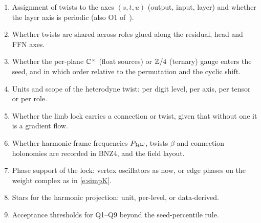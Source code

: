 \documentclass[10pt]{article}
\theoremstyle{definition}
\begin{document}
\begin{enumerate}
\item[O12] Assignment of twists to the axes $(s,t,u)$ (output, input, layer) and whether the layer axis is periodic (also O1 of~\cite{mono}).
\item[O13] Whether twists are shared across roles glued along the residual, head and FFN axes.
\item[O14] Whether the per-plane $\mathbb C^\times$ (float sources) or $\mathbb Z/4$ (ternary) gauge enters the seed, and in which order relative to the permutation and the cyclic shift.
\item[O15] Units and scope of the heterodyne twist: per digit level, per axis, per tensor or per role.
\item[O16] Whether the limb lock carries a connection or twist, given that without one it is a gradient flow.
\item[O17] Whether harmonic-frame frequencies $P_\mathcal H\omega$, twists $\beta$ and connection holonomies are recorded in BNZ4, and the field layout.
\item[O18] Phase support of the lock: vertex oscillators as now, or edge phases on the weight complex as in \eqref{e:simpK}.
\item[O19] Stars for the harmonic projection: unit, per-level, or data-derived.
\item[O20] Acceptance thresholds for Q1--Q9 beyond the seed-percentile rule.
\end{enumerate}
\end{document}
